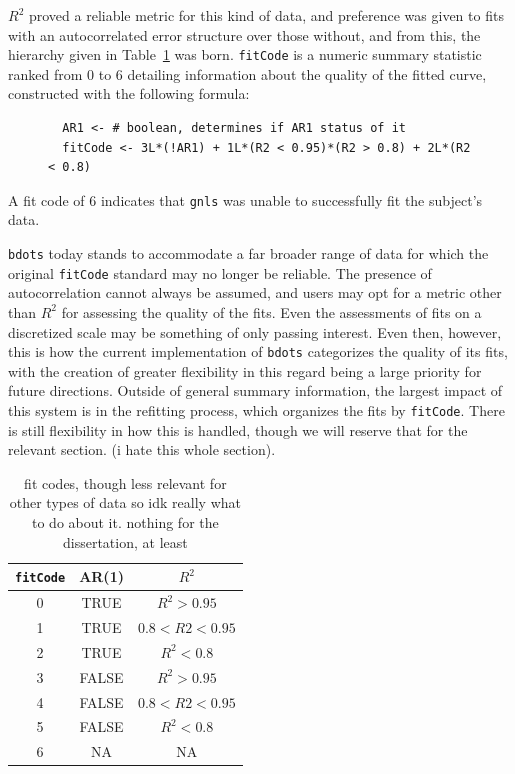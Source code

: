 \documentclass{article}
\newcommand{\xt}{\texttt}%
\begin{document}
$R^2$ proved a reliable metric for this kind of data, and preference was given to fits with an autocorrelated error structure over those without, and from this, the hierarchy given in Table~\ref{tab:fit_codes} was born. \xt{fitCode} is a numeric summary statistic ranked from 0 to 6 detailing information about the quality of the fitted curve, constructed with the following formula:

\begin{singlespace}
\begin{figure}[H]
\centering
\begin{BVerbatim}
  AR1 <- # boolean, determines if AR1 status of it
  fitCode <- 3L*(!AR1) + 1L*(R2 < 0.95)*(R2 > 0.8) + 2L*(R2 < 0.8)
\end{BVerbatim}
\end{figure}
\end{singlespace}

A fit code of 6 indicates that \xt{gnls} was unable to successfully fit the 
subject's data. 

\xt{bdots} today stands to accommodate a far broader range of data for which the original \xt{fitCode} standard may no longer be reliable. The presence of autocorrelation cannot always be assumed, and users may opt for a metric other than $R^2$ for assessing the quality of the fits. Even the assessments of fits on a discretized scale may be something of only passing interest. Even then, however, this is how the current implementation of \xt{bdots} categorizes the quality of its fits, with the creation of greater flexibility in this regard being a large priority for future directions. Outside of general summary information, the largest impact of this system is in the refitting process, which organizes the fits by \xt{fitCode}. There is still flexibility in how this is handled, though we will reserve that for the relevant section. (i hate this whole section).

\begin{singlespace}
\begin{table}[H]
\centering
\def\arraystretch{1.5}
\begin{tabular}{|c|c|c|}
\hline
\xt{fitCode} & AR(1) & $R^2$ \\
\hline
0 & TRUE & $R^2 > 0.95$ \\
1 & TRUE & $0.8 < R2 < 0.95$ \\
2 & TRUE & $ R^2 <0.8$ \\
3 & FALSE & $R^2 >0.95$ \\
4 & FALSE & $0.8 < R2 < 0.95$ \\
5 & FALSE &$ R^2 <0.8$  \\
6 & NA & NA \\
\hline
\end{tabular}
\caption{fit codes, though less relevant for other types of data so idk really what to do about it. nothing for the dissertation, at least}
\label{tab:fit_codes}
\end{table}
\end{singlespace}
\end{document}
